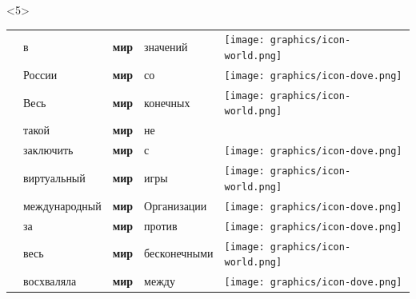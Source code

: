 \documentclass[10pt, compress]{beamer}
\begin{document}
\begin{frame}
\begin{center}
\begin{onlyenv}
\end{onlyenv}
\begin{onlyenv}<5>
\begin{tabular}{p{2.5cm}p{2.5cm}p{1.0cm}p{2.5cm}p{1.0cm}}
      & в    &  \textbf{мир}  & значений     &  \texttt{[image: graphics/icon-world.png]}     \\
      & России    &  \textbf{мир}  & со     &   \texttt{[image: graphics/icon-dove.png]}   \\
      & Весь    &  \textbf{мир}  &  конечных    & \texttt{[image: graphics/icon-world.png]}      \\
      & такой    &  \textbf{мир}  &  не    &      \\
      & заключить    &  \textbf{мир}  & с     & \texttt{[image: graphics/icon-dove.png]}     \\
      & виртуальный    &  \textbf{мир}  & игры     &  \texttt{[image: graphics/icon-world.png]}     \\
      & международный    &  \textbf{мир}  & Организации     & \texttt{[image: graphics/icon-dove.png]}     \\
      & за    &  \textbf{мир}  & против     &  \texttt{[image: graphics/icon-dove.png]}    \\
      & весь    &  \textbf{мир}  &  бесконечными    &   \texttt{[image: graphics/icon-world.png]}    \\
      & восхваляла    &  \textbf{мир}  & между     &  \texttt{[image: graphics/icon-dove.png]}    \\
\end{tabular}

\end{onlyenv}



\end{center}
\end{frame}
\end{document}
